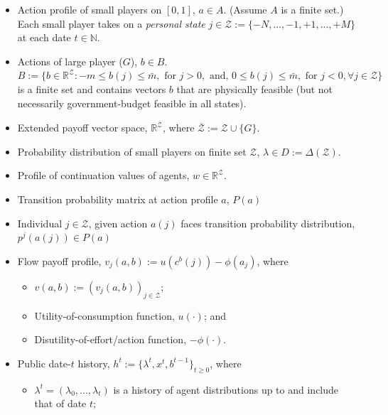 \documentclass[a4paper,10pt,english]{sphinxmanual}
\begin{document}
\begin{itemize}
\item {} 
Action profile of small players on $[0,1]$, $a \in A$. (Assume $A$ is a
finite set.) Each small player takes on a \emph{personal state} $j \in
\mathcal{Z} := \{ -N,...,-1,+1,...,+M\}$ at each date $t \in
\mathbb{N}$.

\item {} 
Actions of large player ($G$), $b \in B$. $B := \{b \in
\mathbb{R}^{\mathcal{Z}}: -m \leq b(j) \leq \bar{m}, \text{ for } j > 0,
\text{ and, } 0 \leq b(j) \leq \bar{m}, \text{ for } j < 0, \forall j \in
\mathcal{Z}\}$ is a
finite set and contains vectors $b$ that are physically feasible
(but not necessarily government-budget feasible in all states).

\item {} 
Extended payoff vector space, $\mathbb{R}^{\overline{\mathcal{Z}}}$,
where $\overline{\mathcal{Z}} := \mathcal{Z} \cup \{G\}$.

\item {} 
Probability distribution of small players on finite set
$\mathcal{Z}$, $\lambda \in D := \Delta(\mathcal{Z})$.

\item {} 
Profile of continuation values of agents, $w \in
\mathbb{R}^{\mathcal{Z}}$.

\item {} 
Transition probability matrix at action profile $a$, $P(a)$

\item {} 
Individual $j \in \mathcal{Z}$, given action $a(j)$ faces transition probability distribution, $p^j(a(j)) \in P(a)$

\item {} 
Flow payoff profile, $v_j(a,b):= u(c^b(j))-\phi(a_j)$, where
\begin{itemize}
\item {} 
$v(a,b):=(v_j(a,b))_{j\in \mathcal{Z}}$;

\item {} 
Utility-of-consumption function, $u(\cdot)$; and

\item {} 
Disutility-of-effort/action function, $-\phi(\cdot)$.

\end{itemize}

\item {} 
Public date-$t$ history, $h^t := \{ \lambda^t, x^t, b^{t-1} \}_{t \geq 0}$, where
\begin{itemize}
\item {} 
$\lambda^t = (\lambda_0,...,\lambda_t)$ is a history of agent
distributions up to and include that of date $t$;


\end{itemize}
\end{itemize}
\end{document}
